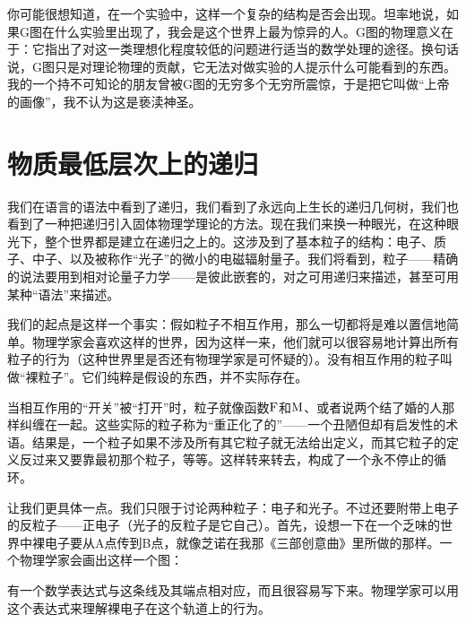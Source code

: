 你可能很想知道，在一个实验中，这样一个复杂的结构是否会出现。坦率地说，如果G图在什么实验里出现了，我会是这个世界上最为惊异的人。G图的物理意义在于：它指出了对这一类理想化程度较低的问题进行适当的数学处理的途径。换句话说，G图只是对理论物理的贡献，它无法对做实验的人提示什么可能看到的东西。我的一个持不可知论的朋友曾被G图的无穷多个无穷所震惊，于是把它叫做“上帝的画像”，我不认为这是亵渎神圣。

\section{物质最低层次上的递归}

我们在语言的语法中看到了递归，我们看到了永远向上生长的递归几何树，我们也看到了一种把递归引入固体物理学理论的方法。现在我们来换一种眼光，在这种眼光下，整个世界都是建立在递归之上的。这涉及到了基本粒子的结构：电子、质子、中子、以及被称作“光子”的微小的电磁辐射量子。我们将看到，粒子——精确的说法要用到相对论量子力学——是彼此嵌套的，对之可用递归来描述，甚至可用某种“语法”来描述。

我们的起点是这样一个事实：假如粒子不相互作用，那么一切都将是难以置信地简单。物理学家会喜欢这样的世界，因为这样一来，他们就可以很容易地计算出所有粒子的行为（这种世界里是否还有物理学家是可怀疑的）。没有相互作用的粒子叫做“裸粒子”。它们纯粹是假设的东西，并不实际存在。

当相互作用的“开关”被“打开”时，粒子就像函数$\operatorname{F}$和$\operatorname{M}$、或者说两个结了婚的人那样纠缠在一起。这些实际的粒子称为“重正化了的”——一个丑陋但却有启发性的术语。结果是，一个粒子如果不涉及所有其它粒子就无法给出定义，而其它粒子的定义反过来又要靠最初那个粒子，等等。这样转来转去，构成了一个永不停止的循环。

让我们更具体一点。我们只限于讨论两种粒子：电子和光子。不过还要附带上电子的反粒子——正电子（光子的反粒子是它自己）。首先，设想一下在一个乏味的世界中裸电子要从A点传到B点，就像芝诺在我那《三部创意曲》里所做的那样。一个物理学家会画出这样一个图：
\begin{figure}[H]
\end{figure}

有一个数学表达式与这条线及其端点相对应，而且很容易写下来。物理学家可以用这个表达式来理解裸电子在这个轨道上的行为。


